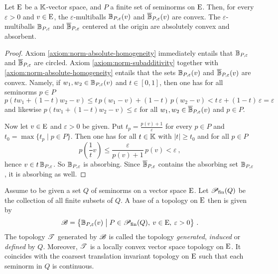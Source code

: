 \begin{proposition}\label{thm:convexity-balls-seminorms}
  Let $\mathrm{E}$ be a $\mathbb{K}$-vector space, and $P$ a finite set of seminorms on $\mathrm{E}$.
  Then, for every $\varepsilon >0$ and $v\in \mathrm{E}$, the $\varepsilon$-multiballs
  $\mathbb{B}_{P,\varepsilon} (v)$ and  $\overline{\mathbb{B}}_{P,\varepsilon} (v)$ are convex.
  The $\varepsilon$-multiballs
  $\mathbb{B}_{P,\varepsilon}$ and  $\overline{\mathbb{B}}_{P,\varepsilon}$ centered at the origin are absolutely convex and absorbent. 
\end{proposition}
\begin{proof}
  Axiom \ref{axiom:norm-absolute-homogeneity} immediately entails that $\mathbb{B}_{P,\varepsilon}$ and  
  $\overline{\mathbb{B}}_{P,\varepsilon}$ are circled. Axiom \ref{axiom:norm-subadditivity} 
  together with  \ref{axiom:norm-absolute-homogeneity} entails that the sets 
  $\mathbb{B}_{P,\varepsilon} (v)$ and $\overline{\mathbb{B}}_{P,\varepsilon} (v)$ 
  are convex. Namely, if $w_1, w_2 \in \mathbb{B}_{P,\varepsilon} (v)$ 
  and $t \in [0,1]$, then one has  for all seminorms $p\in P$
  \[
   p\left( tw_1 + (1-t) w_2 - v \right) \leq 
   t \,  p \left( w_1  - v \right) + (1-t) \, p \left(  w_2 - v \right) < 
   t \, \varepsilon + (1-t) \, \varepsilon = \varepsilon 
  \]
  and likewise $p\left( tw_1 + (1-t) w_2 - v \right) \leq \varepsilon$ for all
  $w_1, w_2 \in \overline{\mathbb{B}}_{P,\varepsilon}(v)$ and  $p\in P$. 

  Now let $v\in \mathrm{E}$ and $\varepsilon >0$ be given. 
  Put $t_p = \frac{p(v)+1}{\varepsilon}$ for every $p\in P$ and $t_0 = \max \{t_p\mid p\in P\}$. 
  Then one has for all $t\in \mathbb{K}$ with $|t|\geq t_0$ and for all $p\in P$
  \[
    p\left( \frac{1}{t} v \right) \leq \frac{\varepsilon}{p(v)+1} \, p(v) < \varepsilon \ ,
  \] 
  hence $v \in t \, \mathbb{B}_{P,\varepsilon}$. So $\mathbb{B}_{P,\varepsilon}$ is absorbing. 
  Since $\overline{\mathbb{B}}_{P,\varepsilon}$  contains the absorbing set $\mathbb{B}_{P,\varepsilon}$,
  it is absorbing as well. 
\end{proof}

\begin{propanddef}
Assume to be given a set $Q$ of seminorms on a vector space $\mathrm{E}$.
Let $\mathscr{P}_\textup{fin}(Q)$ be the collection of all finite subsets of $Q$. 
A base of a topology on $\mathrm{E}$ then is given by  
\[
  \mathscr{B} = \big\{  \mathbb{B}_{P,\varepsilon} (v)  \bigm\vert
  P  \in \mathscr{P}_\textup{fin}(Q) , \: v \in \mathrm{E} , \:  \varepsilon >0 \big\} \ . 
\]
The topology $\mathscr{T}$ generated by $\mathscr{B}$  is called the
topology \emph{generated}, \emph{induced} or \emph{defined} by $Q$. Moreover,
$\mathscr{T}$ is a locally convex vector space topology on $\mathrm{E}$.
It coincides with the coarsest translation invariant topology on
$\mathrm{E}$ such that each seminorm in $Q$ is continuous. 
\end{propanddef}

